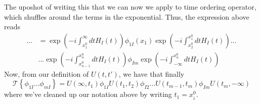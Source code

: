 The uposhot of writing this that we can now we apply to time 
ordering operator, which shuffles around the terms 
in the exponential. Thus, the expression above reads 
\begin{align*} 
	\dots  & = \exp \left(   - i \int _{ x _ 1 ^ 0 } ^ \infty dt H _ I ( t)  \right)  
	\phi _{ 1 I } ( x_ 1 ) \exp \left(  - i \int _{ x_2 ^ 0 } ^{ x_ 1 ^ 0 } dt H _ I ( t)  \right)
	\dots \\
	       & ... \exp \left(  -i  \int _{ x ^ 0 _{ n - 1 } } ^{ x _ n ^ 0 } dt H _I ( t) \right) 
	\phi _{ I m } \exp \left(  - i \int_{ - \infty } ^{ x _ n ^ 0 } dt H _ I ( t)   \right)  
\end{align*}  Now, from our definition of $ U ( t, t' ) $, we have that finally
\[
	\mathcal{ T } \left\{  \phi _{ 1 I } \dots \phi _{ m I }  \right\} = 
	U ( \infty, t _ 1 ) \phi _{ 1 I } U ( t_1 , t_ 2 ) \phi _{ I 2 } \dots
	U ( t _{ m - 1 } , t _ m ) \phi _{ I m } U ( t_ m , - \infty ) 
\] where we've cleaned up our notation above by writing
$ t _ 1 = x_{ i } ^ 0 $.

